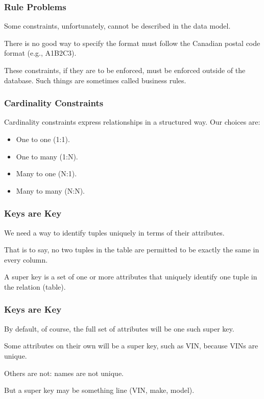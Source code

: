 \begin{frame}
\frametitle{Rule Problems}

Some constraints, unfortunately, cannot be described in the data model. 

There is no good way to specify the format must follow the Canadian postal code format (e.g., A1B2C3). 

These constraints, if they are to be enforced, must be enforced outside of the database. Such things are sometimes called business rules.


\end{frame}




\begin{frame}
\frametitle{Cardinality Constraints}

Cardinality constraints express relationships in a structured way. Our choices are:

\begin{itemize}
\item One to one (1:1).
\item One to many (1:N).
\item Many to one (N:1).
\item Many to many (N:N).
\end{itemize}

\end{frame}



\begin{frame}
\frametitle{Keys are Key}

We need a way to identify tuples uniquely in terms of their attributes. 

That is to say, no two tuples in the table are permitted to be exactly the same in every column. 

A \alert{super key} is a set of one or more attributes that uniquely identify one tuple in the relation (table).

\end{frame}

\begin{frame}
\frametitle{Keys are Key}

By default, of course, the full set of attributes will be one such super key. 

Some attributes on their own will be a super key, such as VIN, because VINs are unique.

Others are not: names are not unique. 

But a super key may be something line (VIN, make, model). 

\end{frame}



